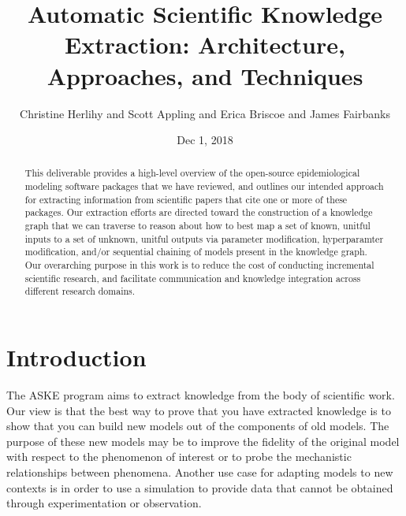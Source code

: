 \documentclass{article}
\title{Automatic Scientific Knowledge Extraction: Architecture, Approaches, and Techniques}
\author{Christine Herlihy and Scott Appling and Erica Briscoe and James Fairbanks}
\date{Dec 1, 2018}
\begin{document}
\maketitle{}

\begin{abstract}
    This deliverable provides a high-level overview of the open-source epidemiological modeling software packages that we have reviewed, and outlines our intended approach for extracting information from scientific papers that cite one or more of these packages. Our extraction efforts are directed toward the construction of a knowledge graph that we can traverse to reason about how to best map a set of known, unitful inputs to a set of unknown, unitful outputs via parameter modification, hyperparamter modification, and/or sequential chaining of models present in the knowledge graph. Our overarching purpose in this work is to reduce the cost of conducting incremental scientific research, and facilitate communication and knowledge integration across different research domains. 

    
    
\end{abstract}


\section{Introduction}

The ASKE program aims to extract knowledge from the body of scientific work. Our view is that the best way to prove that you have extracted knowledge is to show that you can build new models out of the components of old models. The purpose of these new models may be to improve the fidelity of the original model with respect to the phenomenon of interest or to probe the mechanistic relationships between phenomena. Another use case for adapting models to new contexts is in order to use a simulation to provide data that cannot be obtained through experimentation or observation.
\end{document}
